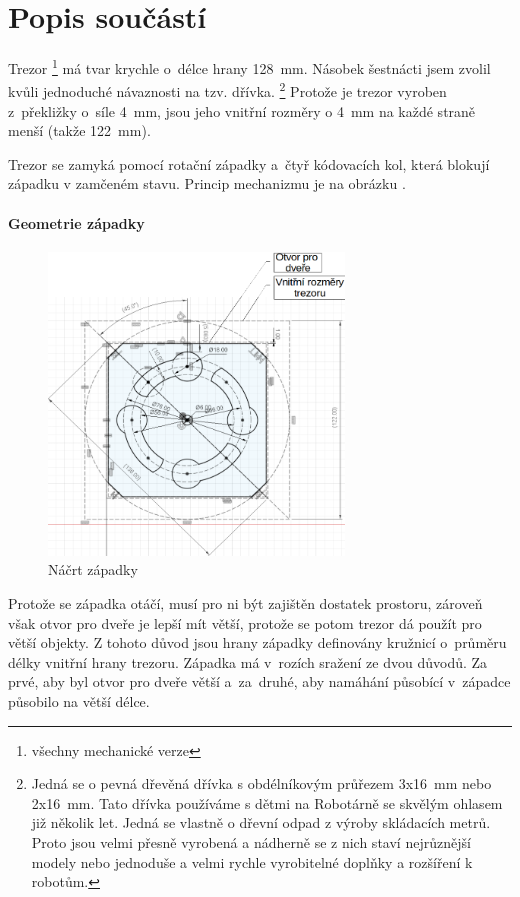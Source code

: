 \section{Popis součástí}

Trezor \footnote{všechny mechanické verze} má tvar krychle o~délce hrany 128~mm. Násobek šestnácti jsem zvolil kvůli jednoduché návaznosti na tzv. dřívka.
\footnote{  
    Jedná se o pevná dřevěná dřívka s obdélníkovým průřezem 3x16~mm nebo 2x16~mm. Tato dřívka používáme s dětmi na Robotárně se skvělým ohlasem již několik 
    let. Jedná se vlastně o dřevní odpad z výroby skládacích metrů. Proto jsou velmi přesně vyrobená a nádherně se z nich staví nejrůznější modely nebo 
    jednoduše a velmi rychle vyrobitelné doplňky a rozšíření k robotům.
}
Protože je trezor vyroben z~překližky o~síle 4~mm, jsou jeho vnitřní rozměry o 4~mm na každé straně menší (takže 122~mm).

Trezor se zamyká pomocí rotační západky a~čtyř kódovacích kol, která blokují západku v zamčeném stavu. 
Princip mechanizmu je na obrázku .

\paragraph{Geometrie západky}
\begin{figure}[h]
	\centering
    \includegraphics[width=0.7\textwidth]{kapitoly/obrazky/M3/geometrie_zapadky.png}
    \caption{Náčrt západky}
    \label{fig:M3-geometrie-zapadky}
\end{figure} 

Protože se západka otáčí, musí pro ni být zajištěn dostatek prostoru, zároveň však otvor pro dveře je lepší mít větší, protože se potom trezor dá použít pro větší objekty.
Z tohoto důvod jsou hrany západky definovány kružnicí o~průměru délky vnitřní hrany trezoru. Západka má v~rozích sražení ze dvou důvodů. Za prvé, aby byl otvor pro
dveře větší a~za~druhé, aby namáhání působící v~západce působilo na větší délce.

